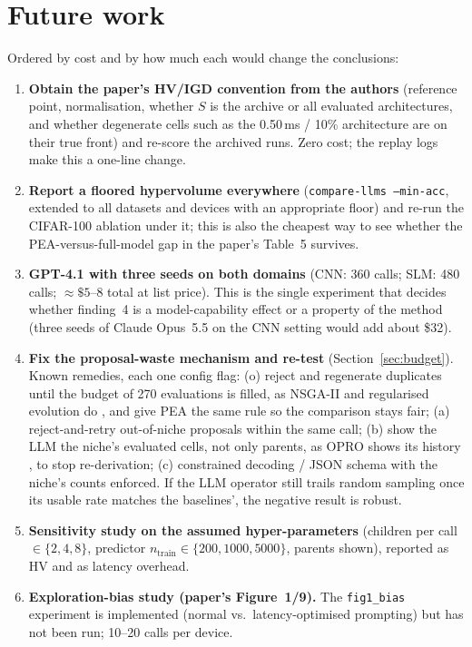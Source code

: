 \documentclass[11pt,a4paper]{article}
\newcommand{\code}[1]{\texttt{#1}}
\begin{document}
\section{Future work}\label{sec:future}
Ordered by cost and by how much each would change the conclusions:
\begin{enumerate}
  \item \textbf{Obtain the paper's HV/IGD convention from the authors} (reference point, normalisation, whether $S$ is the archive or all evaluated architectures, and whether degenerate cells such as the 0.50\,ms / 10\% architecture are on their true front) and re-score the archived runs. Zero cost; the replay logs make this a one-line change.
  \item \textbf{Report a floored hypervolume everywhere} (\code{compare-llms --min-acc}, extended to all datasets and devices with an appropriate floor) and re-run the CIFAR-100 ablation under it; this is also the cheapest way to see whether the PEA-versus-full-model gap in the paper's Table~5 survives.
  \item \textbf{GPT-4.1 with three seeds on both domains} (CNN: 360 calls; SLM: 480 calls; $\approx\$5$--8 total at list price). This is the single experiment that decides whether finding~4 is a model-capability effect or a property of the method (three seeds of Claude Opus~5.5 on the CNN setting would add about \$32).
  \item \textbf{Fix the proposal-waste mechanism and re-test} (Section~\ref{sec:budget}). Known remedies, each one config flag: (o) reject and regenerate duplicates until the budget of 270 evaluations is filled, as NSGA-II and regularised evolution do \cite{mauldin84,lyria}, and give PEA the same rule so the comparison stays fair; (a) reject-and-retry out-of-niche proposals within the same call; (b) show the LLM the niche's evaluated cells, not only parents, as OPRO shows its history \cite{opro}, to stop re-derivation; (c) constrained decoding / JSON schema with the niche's counts enforced. If the LLM operator still trails random sampling once its usable rate matches the baselines', the negative result is robust.
  \item \textbf{Sensitivity study on the assumed hyper-parameters} (children per call $\in\{2,4,8\}$, predictor $n_{\text{train}}\in\{200,1000,5000\}$, parents shown), reported as HV and as latency overhead.
  \item \textbf{Exploration-bias study (paper's Figure~1/9).} The \code{fig1\_bias} experiment is implemented (normal vs.\ latency-optimised prompting) but has not been run; 10--20 calls per device.

\end{enumerate}
\end{document}
